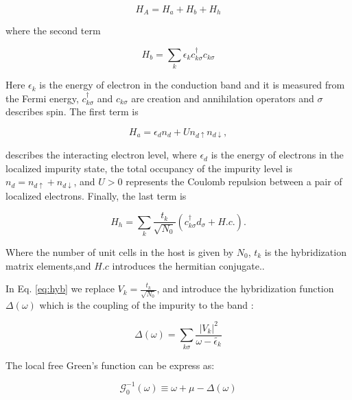 \begin{equation}
H_A=H_a+H_b+H_h
\end{equation}

\noindent where the second term

\begin{equation}
    H_b=\sum_k\epsilon_kc_{k\sigma}^{\dagger} c_{k\sigma}
\end{equation}

\noindent Here $\epsilon_k$ is the energy of electron in the conduction band and it is measured from the Fermi energy, $c_{k\sigma}^{\dagger}$ and $c_{k\sigma}$ are creation and annihilation operators and $\sigma$ describes spin. The first term is

\begin{equation}
    H_a=\epsilon_d n_d+Un_{d\uparrow}n_{d\downarrow},
\end{equation}

\noindent describes the interacting electron level, where $\epsilon_d$ is the energy of electrons in the localized impurity state, the total occupancy of the impurity level is $n_d=n_{d\uparrow}+n_{d\downarrow}$, and $U>0$ represents the Coulomb repulsion between a pair of localized electrons. Finally, the last term is

\begin{equation} \label{eq:hyb}
    H_h=\sum_k \frac{t_k}{\sqrt{N_0}}(c_{k\sigma}^\dagger d_\sigma+H.c.).
\end{equation} 

Where the number of unit cells in the host is given by $N_0$, $t_k$ is  the
hybridization matrix elements,and $H.c$ introduces the hermitian conjugate.. 






In Eq. \ref{eq:hyb} we replace $V_k= \frac{t_k}{\sqrt{N_0}}$, and introduce the hybridization function $\Delta (\omega)$ which is the coupling of the impurity to the band \cite{Alexander}:

\begin{equation}
    \Delta (\omega)=\sum_{k \sigma}\frac{|V_k|^2}{\omega- \tilde{\epsilon_k}}
\end{equation}

\noindent The local free Green's function can be express as:

\begin{equation}
    \mathcal{G}_0^{-1}(\omega)\equiv \omega + \mu-\Delta(\omega)
\end{equation}

